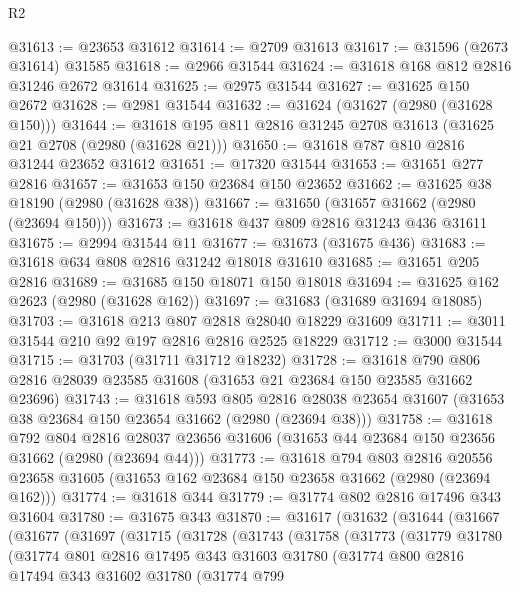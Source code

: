 \begin{lexlean}{R2}
\begin{coremodule}
@31613 := @23653 @31612
@31614 := @2709 @31613
@31617 := @31596 (@2673 @31614) @31585
@31618 := @2966 @31544
@31624 := @31618 @168 @812 @2816 @31246 @2672 @31614
@31625 := @2975 @31544
@31627 := @31625 @150 @2672
@31628 := @2981 @31544
@31632 := @31624 (@31627 (@2980 (@31628 @150)))
@31644 := @31618 @195 @811 @2816 @31245 @2708 @31613 (@31625 @21 @2708 (@2980 (@31628 @21)))
@31650 := @31618 @787 @810 @2816 @31244 @23652 @31612
@31651 := @17320 @31544
@31653 := @31651 @277 @2816
@31657 := @31653 @150 @23684 @150 @23652
@31662 := @31625 @38 @18190 (@2980 (@31628 @38))
@31667 := @31650 (@31657 @31662 (@2980 (@23694 @150)))
@31673 := @31618 @437 @809 @2816 @31243 @436 @31611
@31675 := @2994 @31544 @11
@31677 := @31673 (@31675 @436)
@31683 := @31618 @634 @808 @2816 @31242 @18018 @31610
@31685 := @31651 @205 @2816
@31689 := @31685 @150 @18071 @150 @18018
@31694 := @31625 @162 @2623 (@2980 (@31628 @162))
@31697 := @31683 (@31689 @31694 @18085)
@31703 := @31618 @213 @807 @2818 @28040 @18229 @31609
@31711 := @3011 @31544 @210 @92 @197 @2816 @2816 @2525 @18229
@31712 := @3000 @31544
@31715 := @31703 (@31711 @31712 @18232)
@31728 := @31618 @790 @806 @2816 @28039 @23585 @31608 (@31653 @21 @23684 @150 @23585 @31662 @23696)
@31743 := @31618
    @593
    @805
    @2816
    @28038
    @23654
    @31607
    (@31653 @38 @23684 @150 @23654 @31662 (@2980 (@23694 @38)))
@31758 := @31618
    @792
    @804
    @2816
    @28037
    @23656
    @31606
    (@31653 @44 @23684 @150 @23656 @31662 (@2980 (@23694 @44)))
@31773 := @31618
    @794
    @803
    @2816
    @20556
    @23658
    @31605
    (@31653 @162 @23684 @150 @23658 @31662 (@2980 (@23694 @162)))
@31774 := @31618 @344
@31779 := @31774 @802 @2816 @17496 @343 @31604
@31780 := @31675 @343
@31870 := @31617
    (@31632
      (@31644
        (@31667
          (@31677
            (@31697
              (@31715
                (@31728
                  (@31743
                    (@31758
                      (@31773
                        (@31779
                          @31780
                          (@31774
                            @801
                            @2816
                            @17495
                            @343
                            @31603
                            @31780
                            (@31774
                              @800
                              @2816
                              @17494
                              @343
                              @31602
                              @31780
                              (@31774
                                @799

\end{coremodule}
\end{lexlean}
